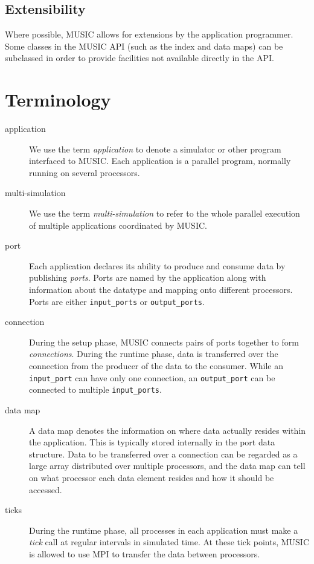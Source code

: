 \documentclass[a4paper]{report}
\begin{document}
\subsection{Extensibility}

Where possible, MUSIC allows for extensions by the application
programmer.  Some classes in the MUSIC API (such as the index and data
maps) can be subclassed in order to provide facilities not available
directly in the API.


\section{Terminology}

\begin{description}
\item[application] We use the term
  \emph{application} to denote a simulator or other
  program interfaced to MUSIC.  Each application is a parallel
  program, normally running on several processors.

\item[multi-simulation] We use the term
  \emph{multi-simulation} to refer to the
  whole parallel execution of multiple applications coordinated by
  MUSIC.

\item[port] Each application declares its ability to produce and
  consume data by publishing \emph{ports}.  Ports are
  named by the application along with information about the datatype
  and mapping onto different processors.  Ports are either
  \lstinline|input_ports| or
  \lstinline|output_ports|.

\item[connection] During the setup phase, MUSIC connects pairs of
  ports together to form \emph{connections}.  During
  the runtime phase, data is transferred over the connection from the
  producer of the data to the consumer.  While an
  \lstinline|input_port| can have only one connection, an
  \lstinline|output_port| can be connected to multiple
  \lstinline|input_ports|.

\item[data map] A data map denotes the information on
  where data actually resides within the application.  This is
  typically stored internally in the port data structure.  Data to be
  transferred over a connection can be regarded as a large array
  distributed over multiple processors, and the data map can tell on
  what processor each data element resides and how it should be
  accessed.

\item[ticks] During the runtime phase, all processes in each
  application must make a \emph{tick} call at regular
  intervals in simulated time.  At these tick points, MUSIC is allowed
  to use MPI to transfer the data between processors.
\end{description}
\end{document}
